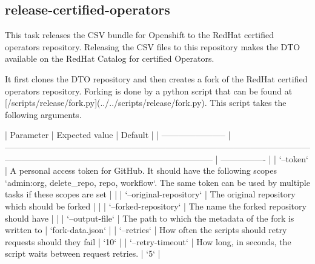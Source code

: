 \subsection{release-certified-operators}\label{subsec:release-certified-operators}

This task releases the CSV bundle for Openshift to the RedHat certified operators repository.
Releasing the CSV files to this repository makes the DTO available on the RedHat Catalog for certified Operators.

It first clones the DTO repository and then creates a fork of the RedHat certified operators repository.
Forking is done by a python script that can be found at [/scripts/release/fork.py](../../scripts/release/fork.py).
This script takes the following arguments.

| Parameter               | Expected value                                                                                                                                                                         | Default          |
| ----------------------- | -------------------------------------------------------------------------------------------------------------------------------------------------------------------------------------- | ---------------- |
| `--token`               | A personal access token for GitHub. It should have the following scopes `admin:org, delete_repo, repo, workflow`. The same token can be used by multiple tasks if these scopes are set |                  |
| `--original-repository` | The original repository which should be forked                                                                                                                                         |                  |
| `--forked-repository`   | The name the forked repository should have                                                                                                                                             |                  |
| `--output-file`         | The path to which the metadata of the fork is written to                                                                                                                               | `fork-data.json` |
| `--retries`             | How often the scripts should retry requests should they fail                                                                                                                           | `10`             |
| `--retry-timeout`       | How long, in seconds, the script waits between request retries.                                                                                                                        | `5`              |

